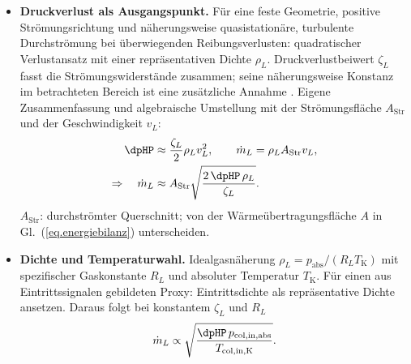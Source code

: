 \begin{itemize}
{    (22.09.2026).} Präzisierung zum vorherigen Punkt: Last und Laderdrehzahl
    können mit dem Luftmassenstrom zusammenhängen; ein entsprechender
    Modellterm bildet diesen Zusammenhang nicht zwangsläufig ab. Für die
    untersuchte Datenbasis einen direkt gemessenen Luftmassenstrom von
    berechneten Referenzkanälen unterscheiden (Kapitel~\ref{ch.datenbasis}).
    Gesucht: ein aus Messgrößen berechneter Ersatz für den relativen
    Luftmassenstrom durch den HP-Kühler. Physikalischer Anschluss:
    Wärmekapazitätsstrom $C_L=\dot m_L c_{p,L}$ in
    Gl.~(\ref{eq.energiebilanz}) und massenstromabhängiger Wärmeübergang.
  \item \textbf{Druckverlust als Ausgangspunkt.} Für eine feste Geometrie,
    positive Strömungsrichtung und näherungsweise quasistationäre,
    turbulente Durchströmung bei überwiegenden Reibungsverlusten:
    quadratischer Verlustansatz mit einer
    repräsentativen Dichte $\rho_L$. Druckverlustbeiwert $\zeta_L$ fasst die
    Strömungswiderstände zusammen; seine näherungsweise Konstanz im
    betrachteten Bereich ist eine zusätzliche Annahme
    \cite[Abschnitte \emph{Momentum Balance} und \emph{Friction}]{mathworksHeatExchangerInterfaceG}.
    Eigene Zusammenfassung und algebraische Umstellung mit der
    Strömungsfläche $A_{\mathrm{Str}}$ und der Geschwindigkeit $v_L$:
    \begin{equation}
      \label{eq.luftproxy.druckverlust}
      \begin{aligned}
        \dpHP &\approx \frac{\zeta_L}{2}\rho_L v_L^2,
        \qquad \dot m_L=\rho_L A_{\mathrm{Str}}v_L,\\
        \Rightarrow\quad \dot m_L &\approx A_{\mathrm{Str}}
          \sqrt{\frac{2\,\dpHP\,\rho_L}{\zeta_L}}.
      \end{aligned}
    \end{equation}
    $A_{\mathrm{Str}}$: durchströmter Querschnitt; von der
    Wärmeübertragungsfläche $A$ in Gl.~(\ref{eq.energiebilanz}) unterscheiden.
  \item \textbf{Dichte und Temperaturwahl.} Idealgasnäherung
    $\rho_L=p_{\mathrm{abs}}/(R_L T_{\mathrm{K}})$ mit spezifischer
    Gaskonstante $R_L$ und absoluter Temperatur $T_{\mathrm{K}}$.
    Für einen aus Eintrittssignalen gebildeten Proxy: Eintrittsdichte als
    repräsentative Dichte ansetzen. Daraus folgt bei konstantem
    $\zeta_L$ und $R_L$
    \begin{equation}
      \label{eq.luftproxy.dichte}
      \dot m_L\propto
      \sqrt{\frac{\dpHP\,p_{\mathrm{col,in,abs}}}
                       {T_{\mathrm{col,in,K}}}}.

\end{equation}
\end{itemize}
